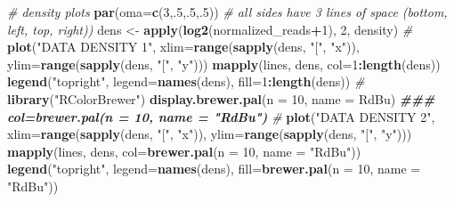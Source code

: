 \documentclass[
]{article}
\newenvironment{Shaded}{\begin{snugshade}}{\end{snugshade}}
\newcommand{\AttributeTok}[1]{\textcolor[rgb]{0.13,0.29,0.53}{#1}}
\newcommand{\CommentTok}[1]{\textcolor[rgb]{0.56,0.35,0.01}{\textit{#1}}}
\newcommand{\DecValTok}[1]{\textcolor[rgb]{0.00,0.00,0.81}{#1}}
\newcommand{\DocumentationTok}[1]{\textcolor[rgb]{0.56,0.35,0.01}{\textbf{\textit{#1}}}}
\newcommand{\FunctionTok}[1]{\textcolor[rgb]{0.13,0.29,0.53}{\textbf{#1}}}
\newcommand{\NormalTok}[1]{#1}
\newcommand{\OtherTok}[1]{\textcolor[rgb]{0.56,0.35,0.01}{#1}}
\newcommand{\SpecialCharTok}[1]{\textcolor[rgb]{0.81,0.36,0.00}{\textbf{#1}}}
\newcommand{\StringTok}[1]{\textcolor[rgb]{0.31,0.60,0.02}{#1}}
\begin{document}
\begin{Shaded}
\begin{Highlighting}[]
\CommentTok{\# density plots}
\FunctionTok{par}\NormalTok{(}\AttributeTok{oma=}\FunctionTok{c}\NormalTok{(}\DecValTok{3}\NormalTok{,.}\DecValTok{5}\NormalTok{,.}\DecValTok{5}\NormalTok{,.}\DecValTok{5}\NormalTok{)) }\CommentTok{\# all sides have 3 lines of space (bottom, left, top, right)) }
\NormalTok{dens }\OtherTok{\textless{}{-}} \FunctionTok{apply}\NormalTok{(}\FunctionTok{log2}\NormalTok{(normalized\_reads}\SpecialCharTok{+}\DecValTok{1}\NormalTok{), }\DecValTok{2}\NormalTok{, density)}
\CommentTok{\#}
\FunctionTok{plot}\NormalTok{(}\StringTok{"DATA DENSITY 1"}\NormalTok{, }\AttributeTok{xlim=}\FunctionTok{range}\NormalTok{(}\FunctionTok{sapply}\NormalTok{(dens, }\StringTok{"["}\NormalTok{, }\StringTok{"x"}\NormalTok{)), }\AttributeTok{ylim=}\FunctionTok{range}\NormalTok{(}\FunctionTok{sapply}\NormalTok{(dens, }\StringTok{"["}\NormalTok{, }\StringTok{"y"}\NormalTok{)))}
\FunctionTok{mapply}\NormalTok{(lines, dens, }\AttributeTok{col=}\DecValTok{1}\SpecialCharTok{:}\FunctionTok{length}\NormalTok{(dens))}
\FunctionTok{legend}\NormalTok{(}\StringTok{"topright"}\NormalTok{, }\AttributeTok{legend=}\FunctionTok{names}\NormalTok{(dens), }\AttributeTok{fill=}\DecValTok{1}\SpecialCharTok{:}\FunctionTok{length}\NormalTok{(dens))}
\CommentTok{\#}
\FunctionTok{library}\NormalTok{(}\StringTok{"RColorBrewer"}\NormalTok{)}
\FunctionTok{display.brewer.pal}\NormalTok{(}\AttributeTok{n =} \DecValTok{10}\NormalTok{, }\AttributeTok{name =} \StringTok{\textquotesingle{}RdBu\textquotesingle{}}\NormalTok{)}
\DocumentationTok{\#\#\#  col=brewer.pal(n = 10, name = "RdBu")}
\CommentTok{\#}
\FunctionTok{plot}\NormalTok{(}\StringTok{"DATA DENSITY 2"}\NormalTok{, }\AttributeTok{xlim=}\FunctionTok{range}\NormalTok{(}\FunctionTok{sapply}\NormalTok{(dens, }\StringTok{"["}\NormalTok{, }\StringTok{"x"}\NormalTok{)), }\AttributeTok{ylim=}\FunctionTok{range}\NormalTok{(}\FunctionTok{sapply}\NormalTok{(dens, }\StringTok{"["}\NormalTok{, }\StringTok{"y"}\NormalTok{)))}
\FunctionTok{mapply}\NormalTok{(lines, dens, }\AttributeTok{col=}\FunctionTok{brewer.pal}\NormalTok{(}\AttributeTok{n =} \DecValTok{10}\NormalTok{, }\AttributeTok{name =} \StringTok{"RdBu"}\NormalTok{))}
\FunctionTok{legend}\NormalTok{(}\StringTok{"topright"}\NormalTok{, }\AttributeTok{legend=}\FunctionTok{names}\NormalTok{(dens), }\AttributeTok{fill=}\FunctionTok{brewer.pal}\NormalTok{(}\AttributeTok{n =} \DecValTok{10}\NormalTok{, }\AttributeTok{name =} \StringTok{"RdBu"}\NormalTok{))}


\end{Highlighting}
\end{Shaded}
\end{document}
